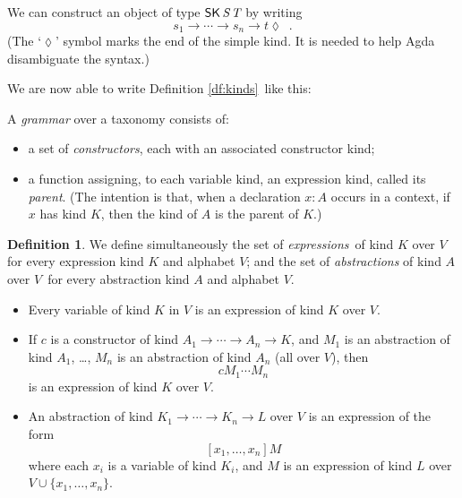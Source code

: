 \documentclass{article}
\theoremstyle{definition}
\newtheorem{df}[example]{Definition}
\begin{document}

We can construct an object of type $\AgdaDatatype{SK} \, \AgdaBound{S} \, \AgdaBound{T}$ by writing 
$$ s_1 \longrightarrow \cdots \longrightarrow s_n \longrightarrow t \lozenge \enspace . $$
(The `$\lozenge$' symbol marks
the end of the simple kind.  It is needed to help Agda disambiguate the syntax.)

We are now able to write Definition \ref{df:kinds} like this:


A \emph{grammar} over a taxonomy consists of:
\begin{itemize}
\item
a set of \emph{constructors}, each with an associated constructor kind;
\item
a function assigning, to each variable kind, an expression kind, called its \emph{parent}.  (The intention is that, when a declaration $x : A$ occurs in a context, if $x$ has kind $K$, then the kind of $A$ is the parent of $K$.)
\end{itemize}


\begin{df}
 We define simultaneously the set of \emph{expressions} of kind $K$ over $V$for every expression kind $K$ and
alphabet $V$;
and the set of \emph{abstractions} of kind $A$ over $V$ for every abstraction kind $A$ and alphabet
$V$.
\begin{itemize}
\item Every variable of kind $K$ in $V$ is an expression of kind $K$ over $V$.
\item If $c$ is a constructor of kind $A_1 \rightarrow \cdots \rightarrow A_n \rightarrow K$,
and $M_1$ is an abstraction of kind $A_1$, \ldots, $M_n$ is an abstraction of kind $A_n$ (all over $V$), then
$$ c M_1 \cdots M_n $$
is an expression of kind $K$ over $V$.
\item
An abstraction of kind $K_1 \rightarrow \cdots \rightarrow K_n \rightarrow L$ over $V$ is
an expression of the form
\[ [x_1, \ldots, x_n] M \]
where each $x_i$ is a variable of kind $K_i$, and $M$ is an expression of kind $L$ over
$V \cup \{ x_1, \ldots, x_n \}$.
\end{itemize}
\end{df}
\end{document}
